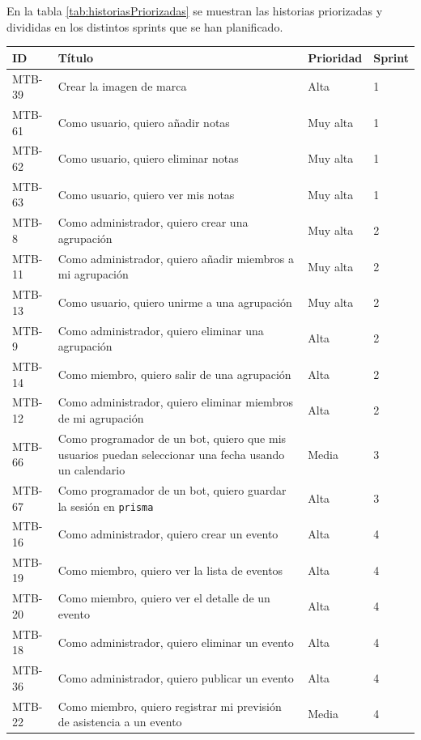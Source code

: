 En la tabla \ref{tab:historiasPriorizadas} se muestran las historias priorizadas y divididas en los distintos sprints que se han planificado.


\begin{longtable}{| p{} | p{} | p{} | p{} |}
\hline
ID & Título & Prioridad & Sprint \\ \hline
MTB-39 & Crear la imagen de marca & Alta & 1 \\ \hline
MTB-61 & Como usuario, quiero añadir notas & Muy alta & 1 \\ \hline
MTB-62 & Como usuario, quiero eliminar notas & Muy alta & 1 \\ \hline
MTB-63 & Como usuario, quiero ver mis notas & Muy alta & 1 \\ \hline
MTB-8 & Como administrador, quiero crear una agrupación & Muy alta & 2 \\ \hline
MTB-11 & Como administrador, quiero añadir miembros a mi agrupación & Muy alta & 2 \\ \hline
MTB-13 & Como usuario, quiero unirme a una agrupación & Muy alta & 2 \\ \hline
MTB-9 & Como administrador, quiero eliminar una agrupación & Alta & 2 \\ \hline
MTB-14 & Como miembro, quiero salir de una agrupación & Alta & 2 \\ \hline
MTB-12 & Como administrador, quiero eliminar miembros de mi agrupación & Alta & 2 \\ \hline
MTB-66 & Como programador de un bot, quiero que mis usuarios puedan seleccionar una fecha usando un calendario & Media & 3 \\ \hline
MTB-67 & Como programador de un bot, quiero guardar la sesión en \texttt{prisma} & Alta & 3 \\ \hline
MTB-16 & Como administrador, quiero crear un evento & Alta & 4 \\ \hline
MTB-19 & Como miembro, quiero ver la lista de eventos & Alta & 4 \\ \hline
MTB-20 & Como miembro, quiero ver el detalle de un evento & Alta & 4 \\ \hline
MTB-18 & Como administrador, quiero eliminar un evento & Alta & 4 \\ \hline
MTB-36 & Como administrador, quiero publicar un evento & Alta & 4 \\ \hline
MTB-22 & Como miembro, quiero registrar mi previsión de asistencia a un evento & Media & 4 \\ \hline

\end{longtable}
